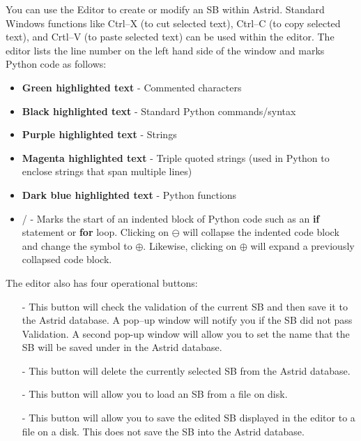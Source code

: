You can use the Editor to create or modify an \gls{SB} within \gls{Astrid}.  Standard
Windows functions like Ctrl--X (to cut selected text), Ctrl--C (to
copy selected text), and Crtl--V (to paste selected text) can be used within
the editor.  The editor lists the line number on the left hand side of the
window and marks Python code as follows:

\begin{itemize}[itemsep=0pt]
\item \textbf{\textcolor{pythonComments}{Green highlighted text}} - Commented characters
\item \textbf{Black highlighted text} - Standard Python commands/syntax
\item \textbf{\textcolor{pythonStrings}{Purple highlighted text}} - Strings
\item \textbf{\textcolor{pythonTripleStrings}{Magenta highlighted text}} - Triple quoted strings
(used in Python to enclose strings that span multiple lines)
\item \textbf{\textcolor{pythonKeywords}{Dark blue highlighted text}} - Python functions
\item \boldmath{$\ominus$}/\boldmath{$\oplus$} - Marks the start of an indented block of Python code
such as an {\bfseries{\textcolor{pythonKeywords}{if}}} statement or
{\bfseries{\textcolor{pythonKeywords}{for}}} loop.  Clicking on $\ominus$ will
collapse the indented code block and change the symbol to $\oplus$.  Likewise,
clicking on $\oplus$ will expand a previously collapsed code block.
\end{itemize}

\noindent The editor also has four operational buttons:

\begin{itemize}[itemsep=0pt,leftmargin=]

\item[\astridfixedbutton{Save to Database}{10em} -] This button will check the validation of the
current \gls{SB} and then save it to the \gls{Astrid} database.  A pop--up
window will notify you if the \gls{SB} did not pass Validation.  A second
pop-up window will allow you to set the name that the \gls{SB} will be saved
under in the \gls{Astrid} database.
\item[\astridfixedbutton{Delete from Database}{10em} -] This button will delete the currently selected
\gls{SB} from the \gls{Astrid} database.
\item[\astridfixedbutton{Import from File}{10em} -] This button will allow you to load an \gls{SB} from
a file on disk.
\item[\astridfixedbutton{Export to File}{10em} -] This button will allow you to save the edited \gls{SB}
displayed in the editor to a file on a disk.  This does not save the \gls{SB}
into the \gls{Astrid} database.
\end{itemize}

